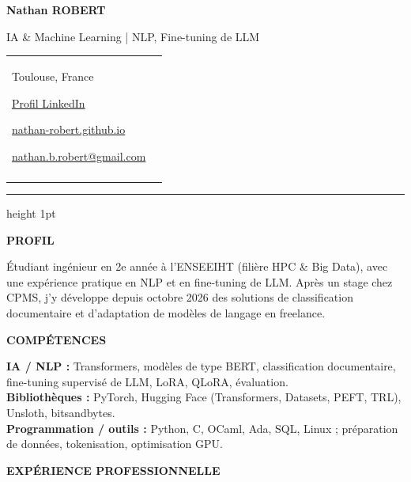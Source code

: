 \documentclass[10pt,a4paper]{extarticle}
\newcommand{\LinkedInURL}{https://www.linkedin.com/in/nathan-robert-b9423a320/}
\newcommand{\PortfolioURL}{https://nathan-robert.github.io/}
\newcommand{\cvsection}[1]{%
  \vspace{9pt}
  {\fontsize{10.5}{12.5}\selectfont\bfseries\color{CVAccent}\MakeUppercase{#1}}\par
  \vspace{3pt}{\color{CVGray!35}\hrule height .45pt}\vspace{4pt}}
\newcommand{\renderqr}{%
  \begin{minipage}[c]{22mm}\centering
  {\setlength{\fboxsep}{2mm}\href{\PortfolioURL}{\colorbox{white}{\qrcode[height=17mm,level=M]{\PortfolioURL}}}}\\[-1pt]
  {\fontsize{7.5}{9}\selectfont\color{CVGray}PORTFOLIO}
  \end{minipage}}
\begin{document}
\begin{minipage}[c]{.55\textwidth}
  {\fontsize{24}{28}\selectfont\bfseries Nathan ROBERT}\par\vspace{4pt}
  {\fontsize{10}{12}\selectfont IA \& Machine Learning | NLP, Fine-tuning de LLM}
\end{minipage}\hfill
\begin{minipage}[c]{.43\textwidth}
  \begin{tabularx}{\linewidth}{@{}>{\raggedleft\arraybackslash}X@{\hspace{6pt}}c@{}}
    \begin{minipage}[c]{\linewidth}\raggedleft
      {\fontsize{9}{12}\selectfont\color{CVGray}Toulouse, France}\par
      {\fontsize{9}{12}\selectfont\href{\LinkedInURL}{Profil LinkedIn}}\par
      {\fontsize{8.8}{12}\selectfont\href{\PortfolioURL}{nathan-robert.github.io}}\par
      {\fontsize{8.8}{12}\selectfont\href{mailto:nathan.b.robert@gmail.com}{nathan.b.robert@gmail.com}}
    \end{minipage} & \renderqr
  \end{tabularx}
\end{minipage}
\vspace{8pt}\par
{\color{CVAccent}\hrule height 1pt}\vspace{1pt}


\cvsection{PROFIL}

Étudiant ingénieur en 2e année à l'ENSEEIHT (filière HPC \& Big Data), avec une expérience pratique en NLP et en fine-tuning de LLM. Après un stage chez CPMS, j'y développe depuis octobre 2026 des solutions de classification documentaire et d'adaptation de modèles de langage en freelance.

\cvsection{COMPÉTENCES}

\textbf{IA / NLP :} Transformers, modèles de type BERT, classification documentaire, fine-tuning supervisé de LLM, LoRA, QLoRA, évaluation.\\[1.6pt]
\textbf{Bibliothèques :} PyTorch, Hugging Face (Transformers, Datasets, PEFT, TRL), Unsloth, bitsandbytes.\\[1.6pt]
\textbf{Programmation / outils :} Python, C, OCaml, Ada, SQL, Linux ; préparation de données, tokenisation, optimisation GPU.

\cvsection{EXPÉRIENCE PROFESSIONNELLE}
\end{document}
